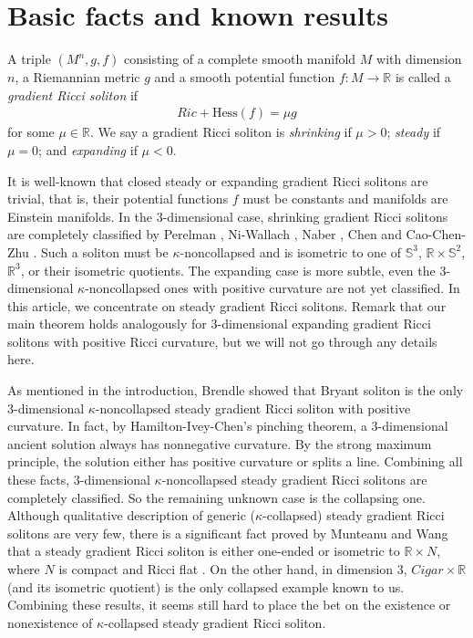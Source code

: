 \documentclass[12pt,a4paper]{amsart}
\begin{document}
\section{Basic facts and known results}

A triple $(M^n,g,f)$ consisting of a complete smooth manifold $M$ with dimension $n$,
a Riemannian metric $g$ and a smooth potential function $f: M\to \mathbb{R}$ is called a {\it gradient Ricci soliton} if
\begin{align*}
Ric+\mathrm{Hess}(f)=\mu g
\end{align*}
for some $\mu\in\mathbb{R}$.
We say a gradient Ricci soliton is {\it shrinking} if $\mu>0$; {\it steady} if $\mu=0$; and {\it expanding} if $\mu<0$.

It is well-known that closed steady or expanding gradient Ricci solitons are trivial, that is,
their potential functions $f$ must be constants and manifolds are Einstein manifolds. In the $3$-dimensional case,
shrinking gradient Ricci solitons are completely classified by Perelman \cite{Perelman02}, Ni-Wallach
\cite{NiWallach08}, Naber \cite{Naber10}, Chen \cite{Chen09} and Cao-Chen-Zhu \cite{CaoChenZhu08}.
Such a soliton must be $\kappa$-noncollapsed and is isometric to one of $\mathbb{S}^3$,
$\mathbb{R}\times\mathbb{S}^2$, $\mathbb{R}^3$, or their isometric quotients.
The expanding case is more subtle, even the $3$-dimensional $\kappa$-noncollapsed ones with positive curvature are not yet classified.
In this article, we concentrate on steady gradient Ricci solitons.
Remark that our main theorem holds analogously for $3$-dimensional expanding gradient Ricci solitons with positive Ricci curvature,
but we will not go through any details here.

As mentioned in the introduction, Brendle \cite{Brendle13} showed that Bryant soliton is the only $3$-dimensional
$\kappa$-noncollapsed steady gradient Ricci soliton with positive curvature.
In fact, by Hamilton-Ivey-Chen's pinching theorem, a $3$-dimensional ancient solution always has nonnegative curvature.
By the strong maximum principle, the solution either has positive curvature or splits a line.
Combining all these facts, $3$-dimensional $\kappa$-noncollapsed steady gradient Ricci solitons are completely classified.
So the remaining unknown case is the collapsing one.
Although qualitative description of generic ($\kappa$-collapsed) steady gradient Ricci solitons are very few,
there is a significant fact proved by Munteanu and Wang that a steady gradient Ricci soliton is either one-ended or isometric to $\mathbb{R}\times N$,
where $N$ is compact and Ricci flat \cite{MunteanuWang11}.
On the other hand, in dimension $3$, $Cigar \times\mathbb{R}$ (and its isometric quotient) is the only collapsed example known to us.
Combining these results, it seems still hard to place the bet on the existence or nonexistence of $\kappa$-collapsed steady gradient Ricci soliton.
\end{document}
